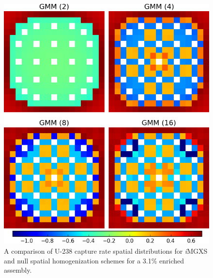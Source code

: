 \begin{figure}[h!]
\centering
\includegraphics[width=0.9\linewidth]{figures/results/compare/assm-31/compare-capt}
\vspace{2mm}
\caption[U-238 capture rate comparison for a 3.1\% enriched assembly]{A comparison of U-238 capture rate spatial distributions for \textit{i}\ac{MGXS} and null spatial homogenization schemes for a 3.1\% enriched assembly.}
\label{fig:chap11-assm-3.1-capt-rates-comp}
\end{figure}

\clearpage

